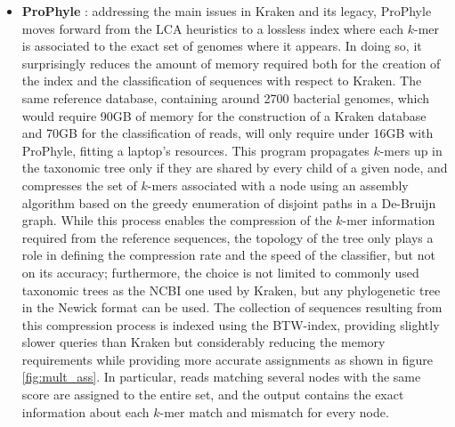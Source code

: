 \begin{itemize}
    \item \textbf{ProPhyle} \cite{brinda_prophyle:_2017}: addressing the main issues in Kraken and its legacy, ProPhyle moves forward from the LCA heuristics to a lossless index where each $k$-mer is associated to the exact set of genomes where it appears. In doing so, it surprisingly reduces the amount of memory required both for the creation of the index and the classification of sequences with respect to Kraken. The same reference database, containing around 2700 bacterial genomes, which would require 90GB of memory for the construction of a Kraken database and 70GB for the classification of reads, will only require under 16GB with ProPhyle, fitting a laptop's resources. This program propagates $k$-mers up in the taxonomic tree only if they are shared by every child of a given node, and compresses the set of $k$-mers associated with a node using an assembly algorithm based on the greedy enumeration of disjoint paths in a De-Bruijn graph. While this process enables the compression of the $k$-mer information required from the reference sequences, the topology of the tree only plays a role in defining the compression rate and the speed of the classifier, but not on its accuracy; furthermore, the choice is not limited to commonly used taxonomic trees as the NCBI one used by Kraken, but any phylogenetic tree in the Newick format can be used. The collection of sequences resulting from this compression process is indexed using the BTW-index, providing slightly slower queries than Kraken but considerably reducing the memory requirements while providing more accurate assignments as shown in figure \ref{fig:mult_ass}. In particular, reads matching several nodes with the same score are assigned to the entire set, and the output contains the exact information about each $k$-mer match and mismatch for every node.
\end{itemize}

